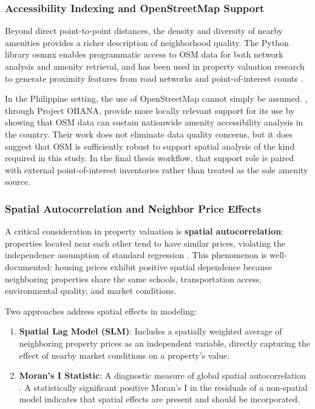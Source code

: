 \subsubsection{Accessibility Indexing and OpenStreetMap Support}\label{amenity-scoring-via-openstreetmap}

Beyond direct point-to-point distances, the density and diversity of nearby amenities provides a richer description of neighborhood quality. The Python library osmnx enables programmatic access to OSM data for both network analysis and amenity retrieval, and has been used in property valuation research to generate proximity features from road networks and point-of-interest counts \parencite{boeing2017osmnx,boeing2019urban}.

In the Philippine setting, the use of OpenStreetMap cannot simply be assumed. \textcite{alvarez2021}, through Project OHANA, provide more locally relevant support for its use by showing that OSM data can sustain nationwide amenity accessibility analysis in the country. Their work does not eliminate data quality concerns, but it does suggest that OSM is sufficiently robust to support spatial analysis of the kind required in this study. In the final thesis workflow, that support role is paired with external point-of-interest inventories rather than treated as the sole amenity source.

\subsubsection{Spatial Autocorrelation and Neighbor Price Effects}\label{spatial-autocorrelation-and-neighbor-price-effects}

A critical consideration in property valuation is \textbf{spatial autocorrelation}: properties located near each other tend to have similar prices, violating the independence assumption of standard regression \parencite{anselin1988}. This phenomenon is well-documented: housing prices exhibit positive spatial dependence because neighboring properties share the same schools, transportation access, environmental quality, and market conditions.

Two approaches address spatial effects in modeling:

\begingroup\setlength{\topsep}{0pt}\setlength{\partopsep}{0pt}
\begin{enumerate}
\item \textbf{Spatial Lag Model (SLM)}: Includes a spatially weighted average of neighboring property prices as an independent variable, directly capturing the effect of nearby market conditions on a property's value.
\item \textbf{Moran's I Statistic}: A diagnostic measure of global spatial autocorrelation \parencite{moran1950}. A statistically significant positive Moran's I in the residuals of a non-spatial model indicates that spatial effects are present and should be incorporated.
\end{enumerate}
\endgroup

